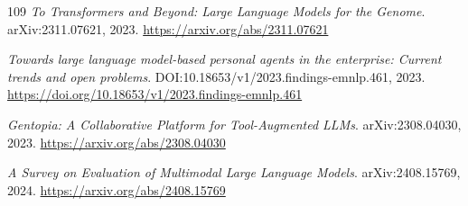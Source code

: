 \documentclass[11pt,a4paper]{article}
\begin{document}
\begin{thebibliography}{109}
\newblock \emph{To Transformers and Beyond: Large Language Models for the Genome}.
\newblock arXiv:2311.07621, 2023.
\newblock \url{https://arxiv.org/abs/2311.07621}

\newblock \emph{Towards large language model-based personal agents in the enterprise: Current trends and open problems}.
\newblock DOI:10.18653/v1/2023.findings-emnlp.461, 2023.
\newblock \url{https://doi.org/10.18653/v1/2023.findings-emnlp.461}

\newblock \emph{Gentopia: A Collaborative Platform for Tool-Augmented LLMs}.
\newblock arXiv:2308.04030, 2023.
\newblock \url{https://arxiv.org/abs/2308.04030}

\newblock \emph{A Survey on Evaluation of Multimodal Large Language Models}.
\newblock arXiv:2408.15769, 2024.
\newblock \url{https://arxiv.org/abs/2408.15769}

\end{thebibliography}
\end{document}
